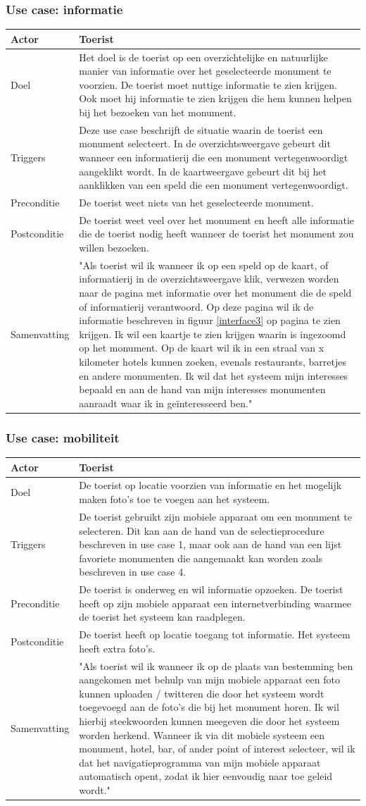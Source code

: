 \documentclass[a4paper,10pt]{article}
\newcommand{\rsubsubsection}[1]{
\subsubsection{#1}\label{sec:sub:sub:#1}
}
\newcommand\addrow[2]{#1 &#2\\ }
\newcommand\addheading[2]{#1 &#2\\ \hline}
\newcommand\tabularhead{\begin{tabular}{| lp{12cm} |}
\hline
}
\newenvironment{usecase}{\tabularhead}{\hline\end{tabular}}
\begin{document}
			\rsubsubsection{Use case: informatie}
			\begin{usecase} 
			\addheading{Actor}{Toerist} 
			\addrow{Doel}{Het doel is de toerist op een overzichtelijke en natuurlijke manier van informatie over het geselecteerde monument te voorzien. De toerist moet nuttige informatie te zien krijgen. Ook moet hij informatie te zien krijgen die hem kunnen helpen bij het bezoeken van het monument.}
			\addrow{Triggers}{Deze use case beschrijft de situatie waarin de toerist een monument selecteert. In de overzichtsweergave gebeurt dit wanneer een informatierij die een monument vertegenwoordigt aangeklikt wordt. In de kaartweergave gebeurt dit bij het aanklikken van een speld die een monument vertegenwoordigt.}
			\addrow{Preconditie}{De toerist weet niets van het geselecteerde monument.}
			\addrow{Postconditie}{De toerist weet veel over het monument en heeft alle informatie die de toerist nodig heeft wanneer de toerist het monument zou willen bezoeken.}
			\addrow{Samenvatting}{"Als toerist wil ik wanneer ik op een speld op de kaart, of informatierij in de overzichtsweergave klik, verwezen worden naar de pagina met informatie over het monument die de speld of informatierij verantwoord. Op deze pagina wil ik de informatie beschreven in figuur \ref{interface3} op pagina \pageref{interface3} te zien krijgen. Ik wil een kaartje te zien krijgen waarin is ingezoomd op het monument. Op de kaart wil ik in een straal van x kilometer hotels kunnen zoeken, evenals restaurants, barretjes en andere monumenten. Ik wil dat het systeem mijn interesses bepaald en aan de hand van mijn interesses monumenten aanraadt waar ik in ge\"interesseerd ben."}
			\end{usecase}	

			\rsubsubsection{Use case: mobiliteit}
			\begin{usecase} 
			\addheading{Actor}{Toerist} 
			\addrow{Doel}{De toerist op locatie voorzien van informatie en het mogelijk maken foto's toe te voegen aan het systeem.}
			\addrow{Triggers}{De toerist gebruikt zijn mobiele apparaat om een monument te selecteren. Dit kan aan de hand van de selectieprocedure beschreven in use case 1, maar ook aan de hand van een lijst favoriete monumenten die aangemaakt kan worden zoals beschreven in use case 4.}
			\addrow{Preconditie}{De toerist is onderweg en wil informatie opzoeken. De toerist heeft op zijn mobiele apparaat een internetverbinding waarmee de toerist het systeem kan raadplegen.}
			\addrow{Postconditie}{De toerist heeft op locatie toegang tot informatie. Het systeem heeft extra foto's.}
			\addrow{Samenvatting}{"Als toerist wil ik wanneer ik op de plaats van bestemming ben aangekomen met behulp van mijn mobiele apparaat een foto kunnen uploaden / twitteren die door het systeem wordt toegevoegd aan de foto's die bij het monument horen. Ik wil hierbij steekwoorden kunnen meegeven die door het systeem worden herkend. Wanneer ik via dit mobiele systeem een monument, hotel, bar, of ander point of interest selecteer, wil ik dat het navigatieprogramma van mijn mobiele apparaat automatisch opent, zodat ik hier eenvoudig naar toe geleid wordt."	}
			\end{usecase}
\end{document}
